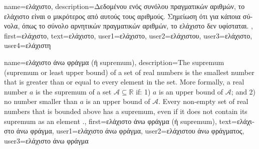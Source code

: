 {name={\foreignlanguage{greek}{ελάχιστο}},
	description={\foreignlanguage{greek}{Δεδομένου ενός συνόλου πραγματικών αριθμών,} 
		\foreignlanguage{greek}{το ελάχιστο είναι ο μικρότερος από αυτούς τους αριθμούς. Σημείωση ότι 
		για κάποια σύνολα, όπως το σύνολο αρνητικών πραγματικών αριθμών, το ελάχιστο δεν υφίσταται.} },
	first={\foreignlanguage{greek}{ελάχιστο}},
	text={\foreignlanguage{greek}{ελάχιστο}},
	user1={\foreignlanguage{greek}{ελάχιστο}}, %
	user2={\foreignlanguage{greek}{ελάχιστου}}, %
	user3={\foreignlanguage{greek}{ελάχιστο}}, %
	user4={\foreignlanguage{greek}{ελάχιστη}} %
}

{name={\foreignlanguage{greek}{ελάχιστο άνω φράγμα (ή} supremum)},
	description={The supremum 
		(supremum or least upper bound) of a set of real numbers is 
		the smallest number that is greater than or equal to every element in the set. More formally, a 
		real number $a$ is the supremum of a set $\mathcal{A} \subseteq \mathbb{R}$ if: 1) $a$ 
		is an upper bound of $\mathcal{A}$; and 2) no number smaller than $a$ is an upper bound of $\mathcal{A}$. 
		Every non-empty set of real numbers that is bounded above has a supremum, even if it does 
		not contain its supremum as an element \cite[Sec.~1.4]{RudinBookPrinciplesMatheAnalysis}.},
	first={\foreignlanguage{greek}{ελάχιστο άνω φράγμα (ή} supremum)},
	text={\foreignlanguage{greek}{ελάχιστο άνω φράγμα}},
	user1={\foreignlanguage{greek}{ελάχιστο άνω φράγμα}}, %
    	user2={\foreignlanguage{greek}{ελάχιστου άνω φράγματος}}, %
    	user3={\foreignlanguage{greek}{ελάχιστο άνω φράγμα}} %
}

